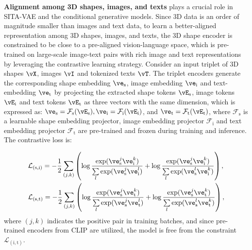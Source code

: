 \documentclass[../../book-main.tex]{subfiles}
\begin{document}
\textbf{Alignment among 3D shapes, images, and texts} plays a crucial
role in SITA-VAE and the conditional generative models. Since 3D data
is an order of magnitude smaller than images and text data, to learn
a better-aligned representation among 3D shapes, images, and texts,
the 3D shape encoder is constrained to be close to a pre-aligned
vision-language space, which is pre-trained on large-scale image-text
pairs with rich image and text representations by leveraging the
contrastive learning strategy. Consider an input triplet of 3D shapes
$\vX$, images $\vI$ and tokenized texts $\vT$. The triplet encoders
generate the corresponding shape embedding $\ve_{\mathrm{s}}$, image
embedding $\ve_{\mathrm{i}}$ and text-embedding $\ve_{\mathrm{t}}$ by
projecting the extracted shape tokens $\vE_{\mathrm{s}}$, image
tokens $\vE_{\mathrm{i}}$ and text tokens $\vE_{\mathrm{t}}$ as three
vectors with the same dimension, which is expressed as:
$\ve_{\mathrm{s}} = \mathcal{F}_{\mathrm{s}}(\vE_{\mathrm{s}}),
\ve_{\mathrm{i}} = \mathcal{F}_{\mathrm{i}}(\vE_{\mathrm{i}})$, and
$\ve_{\mathrm{t}} = \mathcal{F}_{\mathrm{t}}(\vE_{\mathrm{t}})$,
where $\mathcal{F}_{\mathrm{s}}$ is a learnable shape embedding
projector, image embedding projector $\mathcal{F}_{\mathrm{i}}$ and
text embedding projector $\mathcal{F}_{\mathrm{t}}$ are pre-trained
and frozen during training and inference. The contrastive loss is:

\begin{align}
&\mathcal{L}_{(\mathrm{s},\mathrm{i})} = - \frac{1}{2} \sum\limits_{(j,k)}
\left(
\log \frac{\exp (\ve_{\mathrm{s}}^j \ve_{\mathrm{i}}^k) }{
\sum\limits_l \exp (\ve_{\mathrm{s}}^j \ve_{\mathrm{i}}^l) } +
\log \frac{\exp (\ve_{\mathrm{s}}^j \ve_{\mathrm{i}}^k) }{
\sum\limits_l \exp (\ve_{\mathrm{s}}^l \ve_{\mathrm{i}}^k) }
\right), \\
&\mathcal{L}_{(\mathrm{s},\mathrm{t})}  = - \frac{1}{2} \sum\limits_{(j,k)}
\left(
\log \frac{\exp (\ve_{\mathrm{s}}^j \ve_{\mathrm{t}}^k) }{
\sum\limits_l \exp (\ve_{\mathrm{s}}^j \ve_{\mathrm{t}}^l) } +
\log \frac{\exp (\ve_{\mathrm{s}}^j \ve_{\mathrm{t}}^k) }{
\sum\limits_l \exp (\ve_{\mathrm{s}}^l \ve_{\mathrm{t}}^k) }
\right),
\end{align}
where $(j,k)$ indicates the positive pair in training batches, and
since pre-trained encoders from CLIP are utilized, the model is free
from the constraint $\mathcal{L}_{(\mathrm{i}, \mathrm{t})}$.
\end{document}
